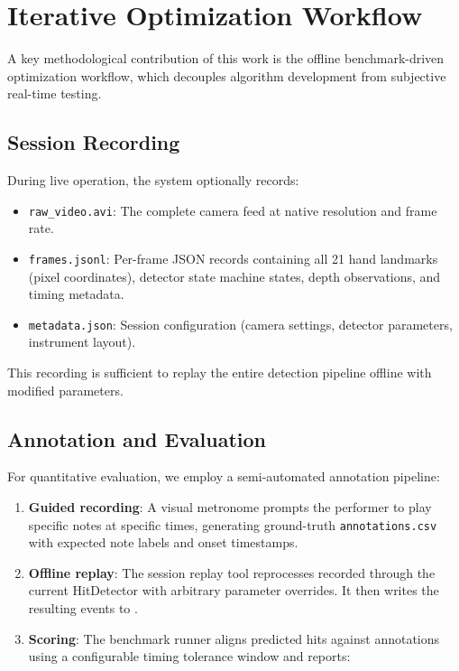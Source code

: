 \documentclass[11pt,a4paper]{article}
\begin{document}
\section{Iterative Optimization Workflow}

A key methodological contribution of this work is the offline benchmark-driven optimization workflow, which decouples algorithm development from subjective real-time testing.

\subsection{Session Recording}

During live operation, the system optionally records:
\begin{itemize}[nosep]
    \item \texttt{raw\_video.avi}: The complete camera feed at native resolution and frame rate.
    \item \texttt{frames.jsonl}: Per-frame JSON records containing all 21 hand landmarks (pixel coordinates), detector state machine states, depth observations, and timing metadata.
    \item \texttt{metadata.json}: Session configuration (camera settings, detector parameters, instrument layout).
\end{itemize}

This recording is sufficient to replay the entire detection pipeline offline with modified parameters.

\subsection{Annotation and Evaluation}

For quantitative evaluation, we employ a semi-automated annotation pipeline:
\begin{enumerate}[nosep]
    \item \textbf{Guided recording}: A visual metronome prompts the performer to play specific notes at specific times, generating ground-truth \texttt{annotations.csv} with expected note labels and onset timestamps.
    \item \textbf{Offline replay}: The session replay tool reprocesses recorded  through the current HitDetector with arbitrary parameter overrides. It then writes the resulting events to .
    \item \textbf{Scoring}: The benchmark runner aligns predicted hits against annotations using a configurable timing tolerance window and reports:
\end{enumerate}
\end{document}
